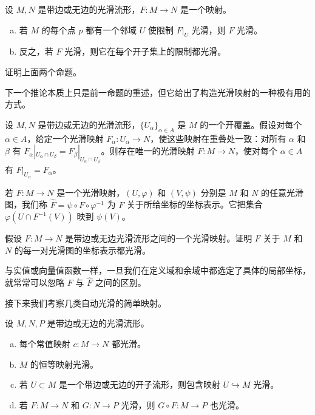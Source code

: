 \documentclass[../../main.tex]{subfiles}
\begin{document}
\begin{proposition}[光滑性是局部的]\label{proposition:ch02-光滑性局部}
设 $M,N$ 是带边或无边的光滑流形，$F:M\to N$ 是一个映射。
\begin{enumerate}[(a)]
\item 若 $M$ 的每个点 $p$ 都有一个邻域 $U$ 使限制 $F|_{U}$ 光滑，则 $F$ 光滑。
\item 反之，若 $F$ 光滑，则它在每个开子集上的限制都光滑。
\end{enumerate}
\end{proposition}

\begin{exercise}\label{exercise:ch02-2.7}
证明上面两个命题。
\end{exercise}

下一个推论本质上只是前一命题的重述，但它给出了构造光滑映射的一种极有用的方式。

\begin{corollary}[光滑映射的粘合引理]\label{corollary:ch02-光滑映射粘合引理}
设 $M,N$ 是带边或无边的光滑流形，$\{U_{\alpha}\}_{\alpha\in A}$ 是 $M$ 的一个开覆盖。假设对每个 $\alpha\in A$，给定一个光滑映射 $F_{\alpha}:U_{\alpha}\to N$，使这些映射在重叠处一致：对所有 $\alpha$ 和 $\beta$ 有 $F_{\alpha}|_{U_{\alpha}\cap U_{\beta}}=F_{\beta}|_{U_{\alpha}\cap U_{\beta}}$。则存在唯一的光滑映射 $F:M\to N$，使对每个 $\alpha\in A$ 有 $F|_{U_{\alpha}}=F_{\alpha}$。
\end{corollary}

若 $F:M\to N$ 是一个光滑映射，$(U,\varphi)$ 和 $(V,\psi)$ 分别是 $M$ 和 $N$ 的任意光滑图，我们称 $\widehat{F}=\psi\circ F\circ\varphi^{-1}$ 为 $F$ 关于所给坐标的坐标表示。它把集合 $\varphi(U\cap F^{-1}(V))$ 映到 $\psi(V)$。

\begin{exercise}\label{exercise:ch02-2.9}
假设 $F:M\to N$ 是带边或无边光滑流形之间的一个光滑映射。证明 $F$ 关于 $M$ 和 $N$ 的每一对光滑图的坐标表示都光滑。
\end{exercise}

与实值或向量值函数一样，一旦我们在定义域和余域中都选定了具体的局部坐标，就常常可以忽略 $F$ 与 $\widehat{F}$ 之间的区别。

接下来我们考察几类自动光滑的简单映射。

\begin{proposition}\label{proposition:ch02-自动光滑映射}
设 $M,N,P$ 是带边或无边的光滑流形。
\begin{enumerate}[(a)]
\item 每个常值映射 $c:M\to N$ 都光滑。
\item $M$ 的恒等映射光滑。
\item 若 $U\subset M$ 是一个带边或无边的开子流形，则包含映射 $U\hookrightarrow M$ 光滑。
\item 若 $F:M\to N$ 和 $G:N\to P$ 光滑，则 $G\circ F:M\to P$ 也光滑。
\end{enumerate}
\end{proposition}
\end{document}
